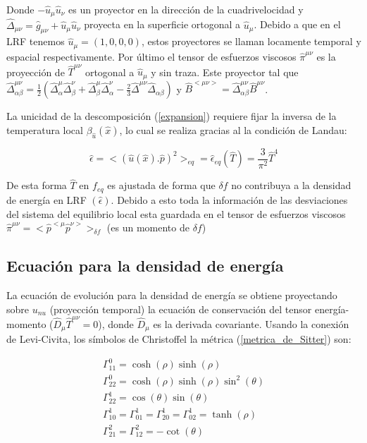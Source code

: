 \documentclass[11pt,a4paper]{article}
\begin{document}
Donde $-\hat{u}_{\mu}\hat{u}_{\nu}$ es un proyector en la dirección de la cuadrivelocidad y $\hat{\Delta}_{{\mu}{\nu}}=\hat{g}_{{\mu}{\nu}}+\hat{u}_{\mu}\hat{u}_{\nu}$  proyecta en la superficie ortogonal a $\hat{u}_{\mu}$. Debido a que en el LRF tenemos $\hat{u}_{\mu}=(1,0,0,0)$, estos proyectores se llaman locamente temporal y espacial respectivamente.
Por último el tensor de esfuerzos viscosos $\hat{\pi}^{{\mu}{\nu}}$ es la proyección de $\hat{T}^{{\mu}{\nu}}$ ortogonal a $\hat{u}_{\mu}$ y sin traza. Este proyector tal que $\hat{\Delta}^{{\mu}{\nu}}_{{\alpha}{\beta}}=\frac{1}{2}(\hat{\Delta}^{\mu}_{\alpha}\hat{\Delta}^{\nu}_{\beta}+\hat{\Delta}^{\mu}_{\beta}\hat{\Delta}^{\nu}_{\alpha}-\frac{2}{3}\hat{\Delta}^{{\mu}{\nu}}\hat{\Delta}_{{\alpha}{\beta}})$ y $\hat{B}^{<{\mu}{\nu}>}=\hat{\Delta}^{{\mu}{\nu}}_{{\alpha}{\beta}}\hat{B}^{{\mu}{\nu}}$.

La unicidad de la descomposición (\ref{expansion}) requiere fijar la inversa de la temperatura local $\beta_{\hat{u}}(\hat{x})$, lo cual se realiza gracias al la condición de Landau:

\begin{equation}
\hat{\epsilon}=<(\hat{u}(\hat{x}).\hat{p})^2>_{eq}=\hat{\epsilon}_{eq}({\hat{T}})=\frac{3}{\pi^2}{\hat{T}}^4
\end{equation}

De esta forma ${\hat{T}}$ en $f_{eq}$ es ajustada de forma que ${\delta}f$ no contribuya  a la densidad de energía en LRF $(\hat{\epsilon})$. Debido a esto toda la información de las desviaciones del sistema del equilibrio local esta guardada en el tensor de esfuerzos viscosos $\hat{\pi}^{{\mu}{\nu}}=<\hat{p}^{<\mu}\hat{p}^{\nu>}>_{{\delta}f}$ (es un momento de ${{\delta}f}$)


\subsection{Ecuación para la densidad de energía}
La ecuación de evolución para la densidad de energía se obtiene proyectando sobre $u_{nu}$ (proyección temporal) la ecuación de conservación del tensor energía-momento ($\hat{D}_{\mu}\hat{T}^{{\mu}{\nu}}=0$), donde $\hat{D}_{\mu}$ es la derivada covariante.
Usando la conexión de Levi-Civita, los símbolos de Christoffel la métrica (\ref{metrica_de_Sitter}) son:

\begin{subequations}
\begin{align}
\label{011}
\Gamma^{0}_{{1}{1}}=\cosh(\rho)\sinh(\rho)\\
\label{022}
\Gamma^{0}_{{2}{2}}=\cosh(\rho)\sinh(\rho)\sin^2(\theta)\\
\Gamma^{1}_{{2}{2}}=\cos(\theta)\sin(\theta)\\
\Gamma^{1}_{{1}{0}}=\Gamma^{1}_{{0}{1}}=\Gamma^{1}_{{2}{0}}=\Gamma^{1}_{{0}{2}}=\tanh(\rho)\\
\Gamma^{2}_{{2}{1}}=\Gamma^{2}_{{1}{2}}=-\cot(\theta)
\end{align}
\label{christoffel}
\end{subequations}
\end{document}
